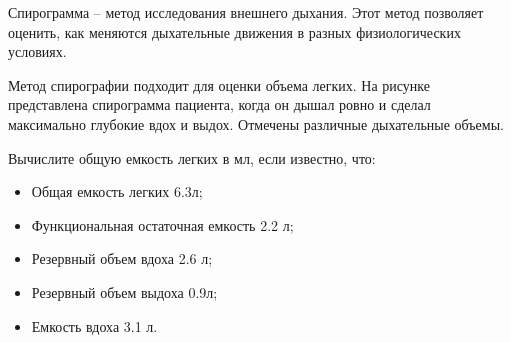 
Спирограмма – метод исследования внешнего дыхания. Этот
метод позволяет оценить, как меняются дыхательные движения в разных
физиологических условиях. 

Метод спирографии подходит для
оценки объема легких. На рисунке представлена спирограмма пациента, когда он
дышал ровно и сделал максимально глубокие вдох и выдох. Отмечены различные
дыхательные объемы.


Вычислите общую емкость легких в мл, если известно, что:

\begin{itemize}
    \item Общая емкость легких 6.3л;
    \item Функциональная остаточная емкость 2.2 л;
    \item Резервный объем вдоха 2.6 л;
    \item Резервный объем выдоха 0.9л;
    \item Емкость вдоха 3.1 л.
\end{itemize}

